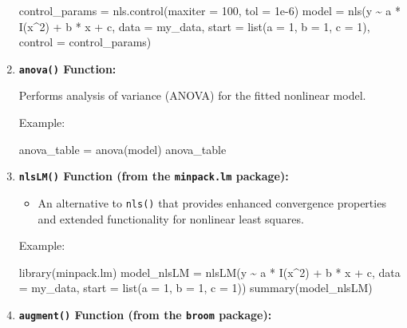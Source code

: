 \documentclass[
]{article}
\newenvironment{Shaded}{}{}
\newcommand{\AttributeTok}[1]{\textcolor[rgb]{0.49,0.56,0.16}{#1}}
\newcommand{\DecValTok}[1]{\textcolor[rgb]{0.25,0.63,0.44}{#1}}
\newcommand{\FloatTok}[1]{\textcolor[rgb]{0.25,0.63,0.44}{#1}}
\newcommand{\FunctionTok}[1]{\textcolor[rgb]{0.02,0.16,0.49}{#1}}
\newcommand{\NormalTok}[1]{#1}
\newcommand{\OtherTok}[1]{\textcolor[rgb]{0.00,0.44,0.13}{#1}}
\newcommand{\SpecialCharTok}[1]{\textcolor[rgb]{0.25,0.44,0.63}{#1}}
\begin{document}
\begin{enumerate}
\begin{Shaded}
\begin{Highlighting}[]
\NormalTok{control\_params }\OtherTok{=} \FunctionTok{nls.control}\NormalTok{(}\AttributeTok{maxiter =} \DecValTok{100}\NormalTok{, }\AttributeTok{tol =} \FloatTok{1e{-}6}\NormalTok{)}
\NormalTok{model }\OtherTok{=} \FunctionTok{nls}\NormalTok{(y }\SpecialCharTok{\textasciitilde{}}\NormalTok{ a }\SpecialCharTok{*} \FunctionTok{I}\NormalTok{(x}\SpecialCharTok{\^{}}\DecValTok{2}\NormalTok{) }\SpecialCharTok{+}\NormalTok{ b }\SpecialCharTok{*}\NormalTok{ x }\SpecialCharTok{+}\NormalTok{ c, }\AttributeTok{data =}\NormalTok{ my\_data, }\AttributeTok{start =} \FunctionTok{list}\NormalTok{(}\AttributeTok{a =} \DecValTok{1}\NormalTok{, }\AttributeTok{b =} \DecValTok{1}\NormalTok{, }\AttributeTok{c =} \DecValTok{1}\NormalTok{), }\AttributeTok{control =}\NormalTok{ control\_params)}
\end{Highlighting}
\end{Shaded}
\item
  \textbf{\texttt{anova()} Function:}

  Performs analysis of variance (ANOVA) for the fitted nonlinear model.

  Example:

\begin{Shaded}
\begin{Highlighting}[]
\NormalTok{anova\_table }\OtherTok{=} \FunctionTok{anova}\NormalTok{(model)}
\NormalTok{anova\_table}
\end{Highlighting}
\end{Shaded}
\item
  \textbf{\texttt{nlsLM()} Function (from the \texttt{minpack.lm}
  package):}

  \begin{itemize}
  \item
    An alternative to \texttt{nls()} that provides enhanced convergence
    properties and extended functionality for nonlinear least squares.
  \end{itemize}

  Example:

\begin{Shaded}
\begin{Highlighting}[]
\FunctionTok{library}\NormalTok{(minpack.lm)}
\NormalTok{model\_nlsLM }\OtherTok{=} \FunctionTok{nlsLM}\NormalTok{(y }\SpecialCharTok{\textasciitilde{}}\NormalTok{ a }\SpecialCharTok{*} \FunctionTok{I}\NormalTok{(x}\SpecialCharTok{\^{}}\DecValTok{2}\NormalTok{) }\SpecialCharTok{+}\NormalTok{ b }\SpecialCharTok{*}\NormalTok{ x }\SpecialCharTok{+}\NormalTok{ c, }\AttributeTok{data =}\NormalTok{ my\_data, }\AttributeTok{start =} \FunctionTok{list}\NormalTok{(}\AttributeTok{a =} \DecValTok{1}\NormalTok{, }\AttributeTok{b =} \DecValTok{1}\NormalTok{, }\AttributeTok{c =} \DecValTok{1}\NormalTok{))}
\FunctionTok{summary}\NormalTok{(model\_nlsLM)}
\end{Highlighting}
\end{Shaded}
\item
  \textbf{\texttt{augment()} Function (from the \texttt{broom}
  package):}


\end{enumerate}
\end{document}
